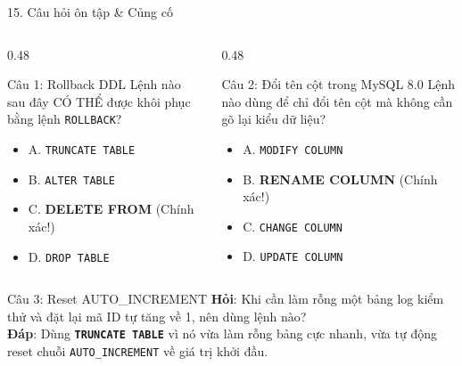 \documentclass[aspectratio=169,11pt]{beamer}
\newcommand{\kw}[1]{\textcolor{dbblue}{\textbf{#1}}}
\newcommand{\smallgap}{\vspace{0.2em}}
\begin{document}
\begin{frame}{15. Câu hỏi ôn tập \& Củng cố}
\begin{columns}[t]
  \begin{column}{0.48\textwidth}
    \begin{block}{Câu 1: Rollback DDL}
      Lệnh nào sau đây CÓ THỂ được khôi phục bằng lệnh \texttt{ROLLBACK}?
      \begin{itemize}
        \item A. \texttt{TRUNCATE TABLE}
        \item B. \texttt{ALTER TABLE}
        \item C. \textbf{\kw{DELETE FROM}} (Chính xác!)
        \item D. \texttt{DROP TABLE}
      \end{itemize}
    \end{block}
  \end{column}
  \begin{column}{0.48\textwidth}
    \begin{block}{Câu 2: Đổi tên cột trong MySQL 8.0}
      Lệnh nào dùng để chỉ đổi tên cột mà không cần gõ lại kiểu dữ liệu?
      \begin{itemize}
        \item A. \texttt{MODIFY COLUMN}
        \item B. \textbf{\kw{RENAME COLUMN}} (Chính xác!)
        \item C. \texttt{CHANGE COLUMN}
        \item D. \texttt{UPDATE COLUMN}
      \end{itemize}
    \end{block}
  \end{column}
\end{columns}
\smallgap
\begin{exampleblock}{Câu 3: Reset AUTO\_INCREMENT}
  \textbf{Hỏi}: Khi cần làm rỗng một bảng log kiểm thử và đặt lại mã ID tự tăng về 1, nên dùng lệnh nào?\\
  \textbf{Đáp}: Dùng \kw{\texttt{TRUNCATE TABLE}} vì nó vừa làm rỗng bảng cực nhanh, vừa tự động reset chuỗi \texttt{AUTO\_INCREMENT} về giá trị khởi đầu.
\end{exampleblock}
\end{frame}
\end{document}
